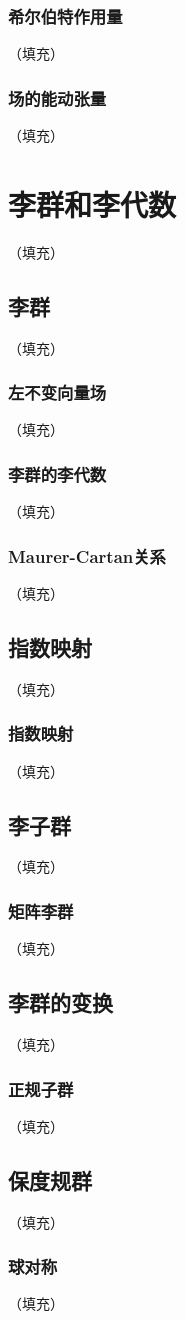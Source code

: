\documentclass[hyperref,UTF8]{ctexbook}
\begin{document}
\subsection{希尔伯特作用量}（填充）
\subsection{场的能动张量}（填充）
\chapter{李群和李代数}（填充）
\section{李群}（填充）
\subsection{左不变向量场}（填充）
\subsection{李群的李代数}（填充）
\subsection{Maurer-Cartan关系}（填充）
\section{指数映射}（填充）
\subsection{指数映射}（填充）
\section{李子群}（填充）
\subsection{矩阵李群}（填充）
\section{李群的变换}（填充）
\subsection{正规子群}（填充）
\section{保度规群}（填充）
\subsection{球对称}（填充）
\end{document}
